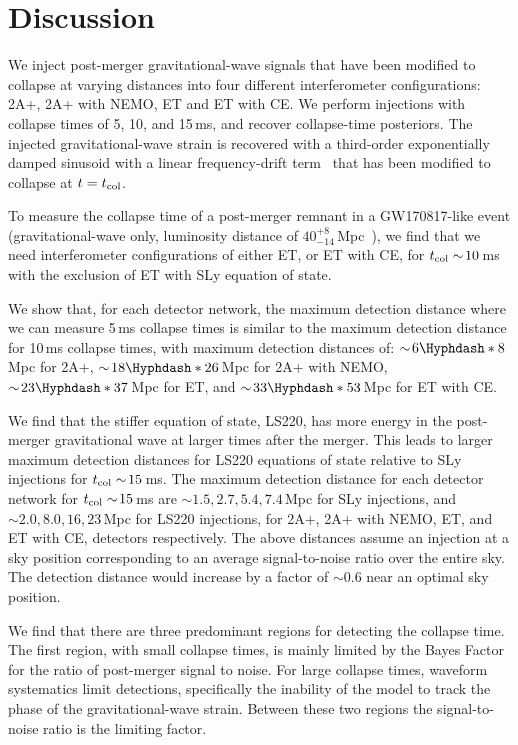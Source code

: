 \documentclass[../Thesis.tex]{subfiles}
\begin{document}
\section{Discussion}\label{sec:discussion3}

    We inject post-merger gravitational-wave signals that have been modified to collapse at varying distances into four different interferometer configurations: 2A+, 2A+ with NEMO, ET and ET with CE.
    We perform injections with collapse times of 5, 10, and 15\,ms, and recover collapse-time posteriors.
    The injected gravitational-wave strain is recovered with a third-order exponentially damped sinusoid with a linear frequency-drift term~\cite{Easter2020} that has been modified to collapse at $t=t_{\mathrm{col}}$. \par
    
    To measure the collapse time of a post-merger remnant in a GW170817-like event (gravitational-wave only, luminosity distance of $40^{+8}_{-14}$\,Mpc~\cite{GW170817multi}), we find that we need interferometer configurations of either ET, or ET with CE, for $t_{\mathrm{col}} \sim\!10$\,ms with the exclusion of ET with SLy equation of state.
    
    
    We show that, for each detector network, the maximum detection distance where we can measure 5\,ms collapse times is similar to the maximum detection distance for 10\,ms collapse times, with maximum detection distances of: $\sim\!6\Hyphdash*8$\,Mpc for 2A+, $\sim\!18\Hyphdash*26$\,Mpc for 2A+ with NEMO, $\sim\!23\Hyphdash*37$\,Mpc for ET, and $\sim\!33\Hyphdash*53$\,Mpc for ET with CE.\par
    
    We find that the stiffer equation of state, LS220, has more energy in the post-merger gravitational wave at larger times after the merger.
    This leads to larger maximum detection distances for LS220 equations of state relative to SLy injections for $t_{\mathrm{col}}\sim\!15$\,ms.
    The maximum detection distance for each detector network for $t_{\mathrm{col}}\sim\!15$\,ms are $\sim 1.5, 2.7, 5.4, 7.4$\,Mpc for SLy injections, and $\sim 2.0, 8.0, 16, 23$\,Mpc for LS220 injections, for 2A+, 2A+ with NEMO, ET, and ET with CE, detectors respectively.
    The above distances assume an injection at a sky position corresponding to an average signal-to-noise ratio over the entire sky.
    The detection distance would increase by a factor of $\sim\!0.6$ near an optimal sky position. \par
    
    We find that there are three predominant regions for detecting the collapse time. The first region, with small collapse times, is mainly limited by the Bayes Factor for the ratio of post-merger signal to noise. 
    For large collapse times, waveform systematics limit detections, specifically the inability of the model to track the phase of the gravitational-wave strain.
    Between these two regions the signal-to-noise ratio is the limiting factor.\par
    
\end{document}
